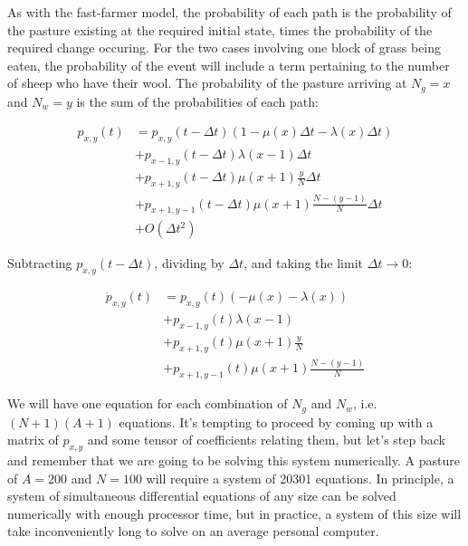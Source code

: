 \documentclass{article}
\begin{document}
As with the fast-farmer model, the probability of each path is the probability of the pasture existing at the required initial state, times the probability of the required change occuring. For the two cases involving one block of grass being eaten, the probability of the event will include a term pertaining to the number of sheep who have their wool. The probability of the pasture arriving at $N_g=x$ and $N_w=y$ is the sum of the probabilities of each path:

\begin{equation*}
    \begin{split}
        p_{x,y}(t)&=p_{x,y}(t-\Delta t)(1-\mu(x)\Delta t-\lambda(x)\Delta t)\\
        &+p_{x-1,y}(t-\Delta t)\lambda(x-1)\Delta t\\
        &+p_{x+1,y}(t-\Delta t)\mu(x+1)\frac{y}{N}\Delta t\\
        &+p_{x+1,y-1}(t-\Delta t)\mu(x+1)\frac{N-(y-1)}{N}\Delta t\\
        &+O(\Delta t^2)
    \end{split}
\end{equation*}

Subtracting $p_{x,y}(t-\Delta t)$, dividing by $\Delta t$, and taking the limit $\Delta t \rightarrow 0$:

\begin{equation}
    \label{p_xy_dot}
    \begin{split}
        \dot{p}_{x,y}(t)&=p_{x,y}(t)(-\mu(x)-\lambda(x))\\
        &+p_{x-1,y}(t)\lambda(x-1)\\
        &+p_{x+1,y}(t)\mu(x+1)\frac{y}{N}\\
        &+p_{x+1,y-1}(t)\mu(x+1)\frac{N-(y-1)}{N}
    \end{split}
\end{equation}

We will have one equation for each combination of $N_g$ and $N_w$, i.e. $(N+1)(A+1)$ equations. It's tempting to proceed by coming up with a matrix of $p_{x,y}$ and some tensor of coefficients relating them, but let's step back and remember that we are going to be solving this system numerically. A pasture of $A=200$ and $N=100$ will require a system of 20301 equations. In principle, a system of simultaneous differential equations of any size can be solved numerically with enough processor time, but in practice, a system of this size will take inconveniently long to solve on an average personal computer.
\end{document}
